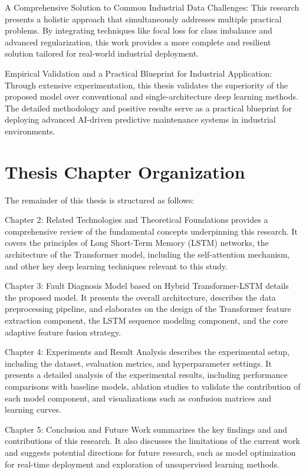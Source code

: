 A Comprehensive Solution to Common Industrial Data Challenges: This research presents a holistic approach that simultaneously addresses multiple practical problems. By integrating techniques like focal loss for class imbalance \cite{lin2017focal} and advanced regularization, this work provides a more complete and resilient solution tailored for real-world industrial deployment.

Empirical Validation and a Practical Blueprint for Industrial Application: Through extensive experimentation, this thesis validates the superiority of the proposed model over conventional and single-architecture deep learning methods. The detailed methodology and positive results serve as a practical blueprint for deploying advanced AI-driven predictive maintenance systems in industrial environments.

\section{Thesis Chapter Organization}
\label{sec:introduction:organization}

The remainder of this thesis is structured as follows:

Chapter 2: Related Technologies and Theoretical Foundations provides a comprehensive review of the fundamental concepts underpinning this research. It covers the principles of Long Short-Term Memory (LSTM) networks, the architecture of the Transformer model, including the self-attention mechanism, and other key deep learning techniques relevant to this study.

Chapter 3: Fault Diagnosis Model based on Hybrid Transformer-LSTM details the proposed model. It presents the overall architecture, describes the data preprocessing pipeline, and elaborates on the design of the Transformer feature extraction component, the LSTM sequence modeling component, and the core adaptive feature fusion strategy.

Chapter 4: Experiments and Result Analysis describes the experimental setup, including the dataset, evaluation metrics, and hyperparameter settings. It presents a detailed analysis of the experimental results, including performance comparisons with baseline models, ablation studies to validate the contribution of each model component, and visualizations such as confusion matrices and learning curves.

Chapter 5: Conclusion and Future Work summarizes the key findings and and contributions of this research. It also discusses the limitations of the current work and suggests potential directions for future research, such as model optimization for real-time deployment and exploration of unsupervised learning methods.